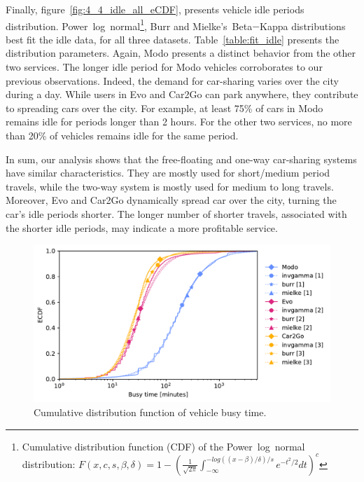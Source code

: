 Finally, figure~\ref{fig:4_4_idle_all_eCDF}, presents vehicle idle periods distribution.  Power~log~normal\footnote{Cumulative distribution function (CDF) of the Power~log~normal distribution: $F(x,c,s,\beta,\delta)=1-\left(\frac{1}{\sqrt{2\pi}}\int_{-\infty}^{-log((x-\beta)/\delta)/s}e^{-t^{2}/2}dt\right)^{c}$}, Burr and Mielke's~Beta$-$Kappa distributions best fit the idle data, for all three datasets. Table~\ref{table:fit_idle} presents the distribution parameters. 
Again, Modo presents a distinct behavior from the other two services. The longer idle period for Modo vehicles corroborates to our previous observations. Indeed, the demand for car-sharing varies over the city during a day. While users in Evo and Car2Go can park anywhere, they contribute to spreading cars over the city. For example, at least 75\% of cars in Modo remains idle for periods longer than 2 hours. For the other two services, no more than 20\% of vehicles remains idle for the same period.

In sum, our analysis shows that the free-floating and one-way car-sharing systems have similar characteristics. They are mostly used for short/medium period travels, while the two-way system is mostly used for medium to long travels. 
Moreover, Evo and Car2Go dynamically spread car over the city, turning the car's idle periods shorter. The longer number of shorter travels, associated with the shorter idle periods, may indicate a more profitable service.

\begin{figure}[tbh]
   \centering
   \includegraphics[width=0.85\columnwidth]{images_test/CDF_Fit_final.pdf}
   \caption{Cumulative distribution function of vehicle busy time.}
   \label{fig:4_4_busy_all_eCDF}
\end{figure}


